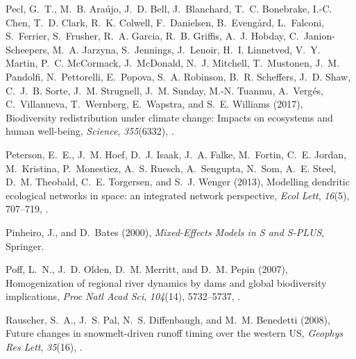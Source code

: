 \documentclass{AGUJournal}
\begin{document}
\begin{thebibliography}{38}
Pecl, G.~T., M.~B. Ara{\'u}jo, J.~D. Bell, J.~Blanchard, T.~C. Bonebrake, I.-C.
  Chen, T.~D. Clark, R.~K. Colwell, F.~Danielsen, B.~Eveng{\aa}rd, L.~Falconi,
  S.~Ferrier, S.~Frusher, R.~A. Garcia, R.~B. Griffis, A.~J. Hobday,
  C.~Janion-Scheepers, M.~A. Jarzyna, S.~Jennings, J.~Lenoir, H.~I. Linnetved,
  V.~Y. Martin, P.~C. McCormack, J.~McDonald, N.~J. Mitchell, T.~Mustonen,
  J.~M. Pandolfi, N.~Pettorelli, E.~Popova, S.~A. Robinson, B.~R. Scheffers,
  J.~D. Shaw, C.~J.~B. Sorte, J.~M. Strugnell, J.~M. Sunday, M.-N. Tuanmu,
  A.~Verg{\'e}s, C.~Villanueva, T.~Wernberg, E.~Wapstra, and S.~E. Williams
  (2017), Biodiversity redistribution under climate change: Impacts on
  ecosystems and human well-being, \textit{Science}, \textit{355}(6332),
  .

Peterson, E.~E., J.~M. Hoef, D.~J. Isaak, J.~A. Falke, M.~Fortin, C.~E. Jordan,
  M.~Kristina, P.~Monestiez, A.~S. Ruesch, A.~Sengupta, N.~Som, A.~E. Steel,
  D.~M. Theobald, C.~E. Torgersen, and S.~J. Wenger (2013), Modelling dendritic
  ecological networks in space: an integrated network perspective, \textit{Ecol
  Lett}, \textit{16}(5), 707--719, .

Pinheiro, J., and D.~Bates (2000), \textit{{Mixed-Effects} Models in S and
  {S-PLUS}}, Springer.

Poff, L.~N., J.~D. Olden, D.~M. Merritt, and D.~M. Pepin (2007), Homogenization
  of regional river dynamics by dams and global biodiversity implications,
  \textit{Proc Natl Acad Sci}, \textit{104}(14), 5732--5737,
  .

Rauscher, S.~A., J.~S. Pal, N.~S. Diffenbaugh, and M.~M. Benedetti (2008),
  Future changes in snowmelt{-}driven runoff timing over the western {US},
  \textit{Geophys Res Lett}, \textit{35}(16), .


\end{thebibliography}
\end{document}

